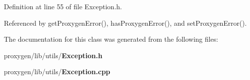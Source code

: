 Definition at line 55 of file Exception.\+h.



Referenced by get\+Proxygen\+Error(), has\+Proxygen\+Error(), and set\+Proxygen\+Error().



The documentation for this class was generated from the following files\+:\begin{DoxyCompactItemize}
\item 
proxygen/lib/utils/{\bf Exception.\+h}\item 
proxygen/lib/utils/{\bf Exception.\+cpp}\end{DoxyCompactItemize}
